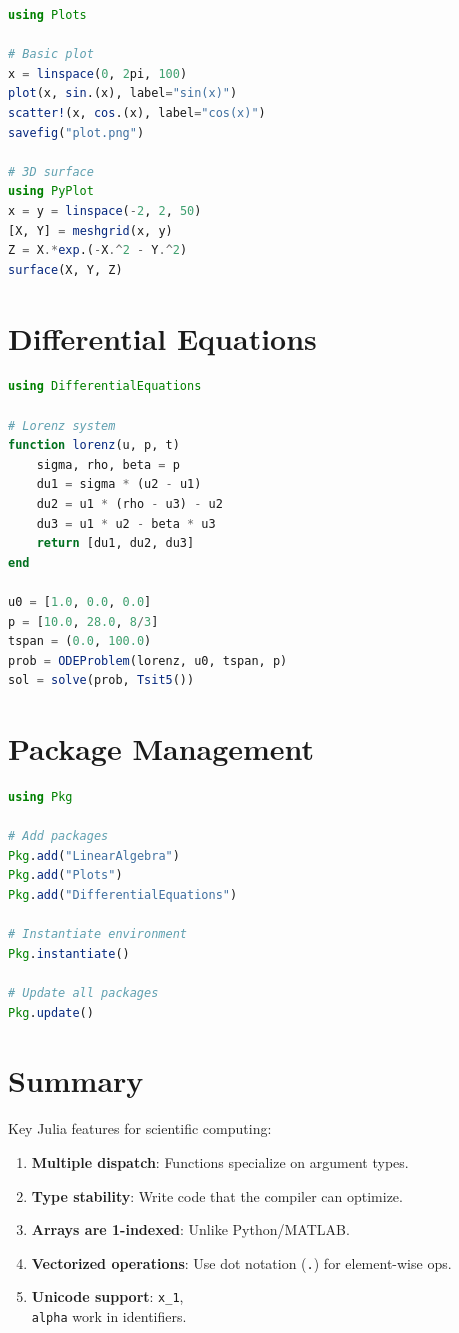 \begin{lstlisting}[language=Julia]
using Plots

# Basic plot
x = linspace(0, 2pi, 100)
plot(x, sin.(x), label="sin(x)")
scatter!(x, cos.(x), label="cos(x)")
savefig("plot.png")

# 3D surface
using PyPlot
x = y = linspace(-2, 2, 50)
[X, Y] = meshgrid(x, y)
Z = X.*exp.(-X.^2 - Y.^2)
surface(X, Y, Z)
    \end{lstlisting}

\section{Differential Equations}
\label{app:julia:ode}

\begin{lstlisting}[language=Julia]
using DifferentialEquations

# Lorenz system
function lorenz(u, p, t)
    sigma, rho, beta = p
    du1 = sigma * (u2 - u1)
    du2 = u1 * (rho - u3) - u2
    du3 = u1 * u2 - beta * u3
    return [du1, du2, du3]
end

u0 = [1.0, 0.0, 0.0]
p = [10.0, 28.0, 8/3]
tspan = (0.0, 100.0)
prob = ODEProblem(lorenz, u0, tspan, p)
sol = solve(prob, Tsit5())
    \end{lstlisting}

\section{Package Management}
\label{app:julia:pkg}

\begin{lstlisting}[language=Julia]
using Pkg

# Add packages
Pkg.add("LinearAlgebra")
Pkg.add("Plots")
Pkg.add("DifferentialEquations")

# Instantiate environment
Pkg.instantiate()

# Update all packages
Pkg.update()
    \end{lstlisting}

\section{Summary}
\label{app:julia:summary}

Key Julia features for scientific computing:
\begin{enumerate}
    \item \textbf{Multiple dispatch}: Functions specialize on argument types.
    \item \textbf{Type stability}: Write code that the compiler can optimize.
    \item \textbf{Arrays are 1-indexed}: Unlike Python/MATLAB.
    \item \textbf{Vectorized operations}: Use dot notation (\texttt{.}) for element-wise ops.
    \item \textbf{Unicode support}: \texttt{x\_1}, \texttt{\\alpha} work in identifiers.
\end{enumerate}

